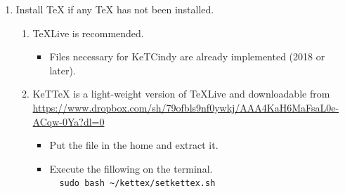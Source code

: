 \documentclass{article}
\begin{document}
\begin{enumerate}[\bf\large 1.]
\item Install TeX if any TeX has not been installed.
  \begin{enumerate}[(1)]
  \item TeXLive is recommended.
    \begin{itemize}
    \item Files necessary for KeTCindy are already implemented (2018 or later).
    \end{itemize}
  \item KeTTeX is a light-weight version of TeXLive and downloadable from\\
  \hspace*{6mm}\url{https://www.dropbox.com/sh/79ofbls9nf0ywkj/AAA4KaH6MaFsaL0e-ACqw-0Ya?dl=0}
    \begin{itemize}
    \item Put the file in the home and extract it.
    \item Execute the fillowing on the terminal.\\
　\hspace*{10mm}\verb|sudo bash ~/kettex/setkettex.sh|
    \end{itemize}
 \end{enumerate}


\end{enumerate}
\end{document}

